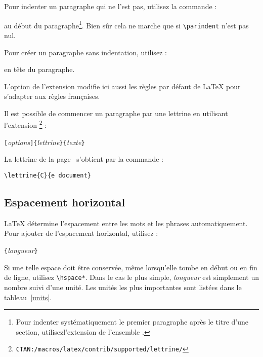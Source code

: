 Pour indenter un paragraphe qui ne l'est pas, utilisez la commande :
\begin{lscommand}
\end{lscommand}
\noindent au début du paragraphe\footnote{Pour indenter
 systématiquement le premier
 paragraphe après le titre d'une section, utilisez\footnotemark l'extension
  de l'ensemble .}. Bien sûr cela ne
 marche que si \verb|\parindent| n'est pas nul.

Pour créer un paragraphe sans indentation, utilisez :
\begin{lscommand}
\end{lscommand}
\noindent
en tête du paragraphe.

L'option  de l'extension  modifie ici aussi
les règles par défaut de
\LaTeX{} pour s'adapter aux règles françaises.

Il est possible de commencer un paragraphe par une lettrine en utilisant
l'extension %
\footnote{\texttt{CTAN:/macros/latex/contrib/supported/lettrine/}} :
\begin{lscommand}
\verb|[|\emph{options}\verb|]{|\emph{lettrine}\verb|}|\verb|{|\emph{texte}\verb|}|
\end{lscommand}
La lettrine de la page~\pageref{lettrine} s'obtient par la commande :
\begin{code}
\verb|\lettrine{C}{e document}|
\end{code}

\subsection{Espacement horizontal}
\label{sec:hspace}

\LaTeX{} détermine l'espacement entre les mots et les phrases
automatiquement. Pour ajouter de l'espacement horizontal, utilisez :
\begin{lscommand}
\verb|{|\emph{longueur}\verb|}|
\end{lscommand}
Si une telle espace doit être conservée, même lorsqu'elle tombe en début ou en
fin de ligne, utilisez \verb|\hspace*|. Dans le cas le plus simple,
\emph{longueur} est simplement un nombre suivi d'une unité. Les unités
les plus importantes sont listées dans le tableau~\ref{units}.

